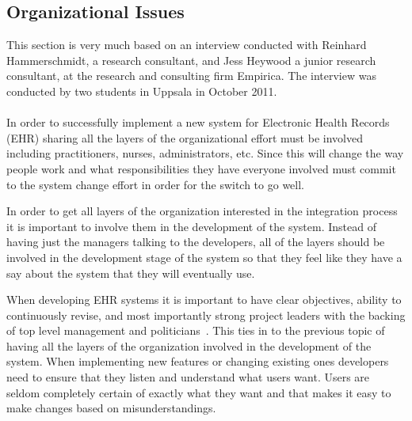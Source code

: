 \documentclass[14pt]{article}
\begin{document}
\subsection{Organizational Issues}
\label{sec:futureOrganizational}
This section is very much based on an interview conducted with Reinhard Hammerschmidt, a research consultant, and Jess Heywood a junior research consultant, at the research and consulting firm Empirica. The interview was conducted by two students in Uppsala in October 2011.
\\\\
In order to successfully implement a new system for Electronic Health Records (EHR) sharing all the layers of the organizational effort must be involved including practitioners, nurses, administrators, etc. Since this will change the way people work and what responsibilities they have everyone involved must commit to the system change effort in order for the switch to go well.

In order to get all layers of the organization interested in the integration process it is important to involve them in the development of the system. Instead of having just the managers talking to the developers, all of the layers should be involved in the development stage of the system so that they feel like they have a say about the system that they will eventually use.

When developing EHR systems it is important to have clear objectives, ability to continuously revise, and most importantly strong project leaders with the backing of top level management and politicians~\cite{Empirica}. This ties in to the previous topic of having all the layers of the organization involved in the development of the system. When implementing new features or changing existing ones developers need to ensure that they listen and understand what users want. Users are seldom completely certain of exactly what they want and that makes it easy to make changes based on misunderstandings.
\end{document}
